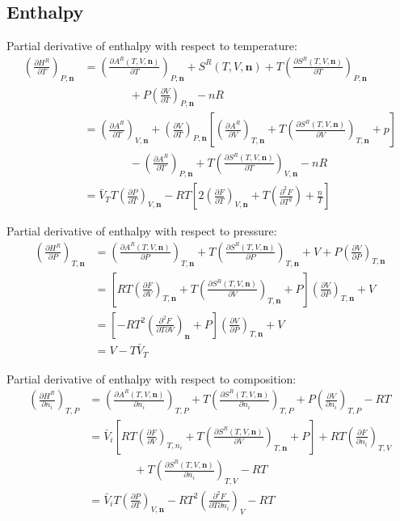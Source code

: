 \documentclass[internal,english]{sintefmemo2012}
\numberwithin{equation}{section}
\newcommand*{\pder}[2]{\left(\frac{\partial #1}{\partial #2}\right)}
\newcommand*{\pdder}[2]{\left(\frac{\partial^2 #1}{\partial #2^2}\right)}
\newcommand*{\pdcross}[3]{\left(\frac{\partial^2 #1}{\partial #2 \partial #3}\right)}
\begin{document}
\subsection{Enthalpy}
Partial derivative of enthalpy with respect to temperature:
\begin{equation}
\begin{split}
\pder{H^R}{T}_{P, \textbf{n}} & = \pder{A^R(T,V,\textbf{n})}{T}_{P, \textbf{n}} + S^R(T,V,\textbf{n}) + T \pder{S^R(T,V,\textbf{n})}{T}_{P, \textbf{n}} \\
& \qquad \qquad + P \pder{V}{T}_{P,\textbf{n}} - nR \\
& = \pder{A^R}{T}_{V,\textbf{n}} +\pder{V}{T}_{P,\textbf{n}} \left[ \pder{A^R}{V}_{T,\textbf{n}} + T \pder{S^R(T,V,\textbf{n})}{V}_{T,\textbf{n}} + p \right] \\
& \qquad \qquad - \pder{A^R}{T}_{P,\textbf{n}} + T\pder{S^R(T,V,\textbf{n})}{T}_{V,\textbf{n}} - nR \\
& = \bar{V}_T T \pder{P}{T}_{V,\textbf{n}} - RT \left[ 2\pder{F}{T}_{V,\textbf{n}} + T \pdder{F}{T} + \frac{n}{T} \right]
\end{split}
\end{equation}

Partial derivative of enthalpy with respect to pressure:
\begin{equation}
\begin{split}
\pder{H^R}{P}_{T, \textbf{n}} & =  \pder{A^R(T,V,\textbf{n})}{P}_{T, \textbf{n}} + T \pder{S^R(T,V,\textbf{n})}{P}_{T, \textbf{n}} + V + P \pder{V}{P}_{T,\textbf{n}} \\
& = \left[ RT \pder{F}{V}_{T,\textbf{n}} + T \pder{S^R(T,V,\textbf{n})}{V}_{T,\textbf{n}} + P \right] \pder{V}{P}_{T,\textbf{n}} + V \\
& = \left[- RT^2 \pdcross{F}{T}{V}_{\textbf{n}}  + P \right] \pder{V}{P}_{T,\textbf{n}} + V \\
& = V - T \bar{V}_T
\end{split}
\end{equation}

Partial derivative of enthalpy with respect to composition:
\begin{equation}
\begin{split}
\pder{H^R}{n_i}_{T,P} & = \pder{A^R(T,V,\textbf{n})}{n_i}_{T,P} + T \pder{S^R(T,V,\textbf{n})}{n_i}_{T,P} + P \pder{V}{n_i}_{T,P} - RT \\
& = \bar{V}_i \left[ RT \pder{F}{V}_{T,n_i} + T \pder{S^R(T,V,\textbf{n})}{V}_{T,\textbf{n}} + P \right] + RT\pder{F}{n_i}_{T,V}  \\
& \qquad \qquad  + T\pder{S^R(T,V,\textbf{n})}{n_i}_{T,V}  - RT \\
& = \bar{V}_i T \pder{P}{T}_{V,\textbf{n}} -RT^2 \pdcross{F}{T}{n_i}_V - RT
\end{split} 
\end{equation}
\end{document}
